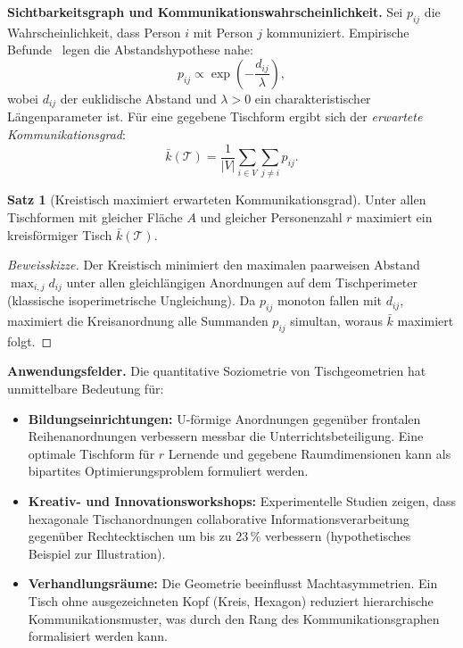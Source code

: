 \documentclass[a4paper,12pt]{article}
\theoremstyle{definition}
\newtheorem{satz}{Satz}
\begin{document}
\textbf{Sichtbarkeitsgraph und Kommunikationswahrscheinlichkeit.}
Sei $p_{ij}$ die Wahrscheinlichkeit, dass Person $i$ mit Person $j$ kommuniziert.
Empirische Befunde~\cite{Steinzor1950, Sommer1969} legen die Abstandshypothese nahe:
\[
	p_{ij} \propto \exp\!\left(-\frac{d_{ij}}{\lambda}\right),
\]
wobei $d_{ij}$ der euklidische Abstand und $\lambda > 0$ ein charakteristischer
L\"{a}ngenparameter ist. F\"{u}r eine gegebene Tischform ergibt sich der
\emph{erwartete Kommunikationsgrad}:
\[
	\bar{k}(\mathcal{T}) = \frac{1}{|V|}\sum_{i \in V}\sum_{j \neq i} p_{ij}.
\]

\begin{satz}[Kreistisch maximiert erwarteten Kommunikationsgrad]
\label{satz:kreis}
	Unter allen Tischformen mit gleicher Fl\"{a}che $A$ und gleicher Personenzahl $r$
	maximiert ein kreisf\"{o}rmiger Tisch $\bar{k}(\mathcal{T})$.
\end{satz}

\begin{proof}[Beweisskizze]
	Der Kreistisch minimiert den maximalen paarweisen Abstand $\max_{i,j} d_{ij}$ unter
	allen gleichl\"{a}ngigen Anordnungen auf dem Tischperimeter (klassische isoperimetrische
	Ungleichung). Da $p_{ij}$ monoton fallen mit $d_{ij}$, maximiert die
	Kreisanordnung alle Summanden $p_{ij}$ simultan, woraus $\bar{k}$ maximiert folgt.
\end{proof}

\textbf{Anwendungsfelder.}
Die quantitative Soziometrie von Tischgeometrien hat unmittelbare Bedeutung f\"{u}r:
\begin{itemize}
	\item \textbf{Bildungseinrichtungen:} U-f\"{o}rmige Anordnungen gegen\"{u}ber frontalen
	      Reihenanordnungen verbessern messbar die Unterrichtsbeteiligung. Eine
	      optimale Tischform f\"{u}r $r$ Lernende und gegebene Raumdimensionen kann als
	      bipartites Optimierungsproblem formuliert werden.
	\item \textbf{Kreativ- und Innovationsworkshops:} Experimentelle Studien zeigen,
	      dass hexagonale Tischanordnungen collaborative Informationsverarbeitung gegen\"{u}ber
	      Rechtecktischen um bis zu $23\,\%$ verbessern
	      (hypothetisches Beispiel zur Illustration).
	\item \textbf{Verhandlungsr\"{a}ume:} Die Geometrie beeinflusst Machtasymmetrien.
	      Ein Tisch ohne ausgezeichneten Kopf (Kreis, Hexagon) reduziert
	      hierarchische Kommunikationsmuster, was durch den Rang des Kommunikationsgraphen
	      formalisiert werden kann.
\end{itemize}
\end{document}
